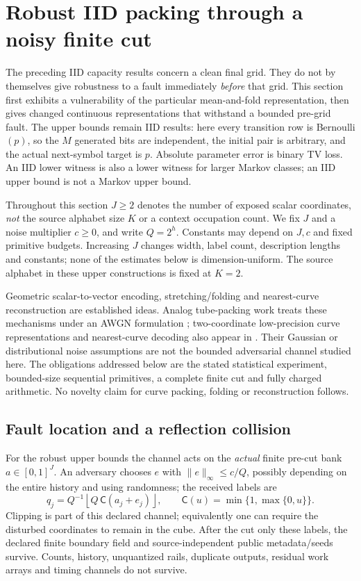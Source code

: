 \documentclass[11pt,letterpaper]{article}
\theoremstyle{definition}\newtheorem{definition}[theorem]{Definition}
\theoremstyle{remark}\newtheorem{remark}[theorem]{Remark}
\newcommand{\floor}[1]{\left\lfloor #1\right\rfloor}
\begin{document}
\section{Robust IID packing through a noisy finite cut}\label{sec:robustiid}
The preceding IID capacity results concern a clean final grid. They do not by themselves give robustness to a fault immediately \emph{before} that grid. This section first exhibits a vulnerability of the particular mean-and-fold representation, then gives changed continuous representations that withstand a bounded pre-grid fault. The upper bounds remain IID results: here every transition row is Bernoulli$(p)$, so the $M$ generated bits are independent, the initial pair is arbitrary, and the actual next-symbol target is $p$. Absolute parameter error is binary TV loss. An IID lower witness is also a lower witness for larger Markov classes; an IID upper bound is not a Markov upper bound.

Throughout this section $J\ge2$ denotes the number of exposed scalar coordinates, \emph{not} the source alphabet size $K$ or a context occupation count. We fix $J$ and a noise multiplier $c\ge0$, and write $Q=2^h$. Constants may depend on $J,c$ and fixed primitive budgets. Increasing $J$ changes width, label count, description lengths and constants; none of the estimates below is dimension-uniform. The source alphabet in these upper constructions is fixed at $K=2$.

Geometric scalar-to-vector encoding, stretching/folding and nearest-curve reconstruction are established ideas. Analog tube-packing work treats these mechanisms under an AWGN formulation \citep{taylor2013}; two-coordinate low-precision curve representations and nearest-curve decoding also appear in \citet{uss2025}. Their Gaussian or distributional noise assumptions are not the bounded adversarial channel studied here. The obligations addressed below are the stated statistical experiment, bounded-size sequential primitives, a complete finite cut and fully charged arithmetic. No novelty claim for curve packing, folding or reconstruction follows.

\subsection{Fault location and a reflection collision}
For the robust upper bounds the channel acts on the \emph{actual} finite pre-cut bank $a\in[0,1]^J$. An adversary chooses $e$ with $\|e\|_\infty\le c/Q$, possibly depending on the entire history and using randomness; the received labels are
\begin{equation}\label{eq:pregridchannel}
 q_j=Q^{-1}\floor{Q\,\mathsf C(a_j+e_j)},\qquad
 \mathsf C(u)=\min\{1,\max\{0,u\}\}.
\end{equation}
Clipping is part of this declared channel; equivalently one can require the disturbed coordinates to remain in the cube. After the cut only these labels, the declared finite boundary field and source-independent public metadata/seeds survive. Counts, history, unquantized rails, duplicate outputs, residual work arrays and timing channels do not survive.
\end{document}
